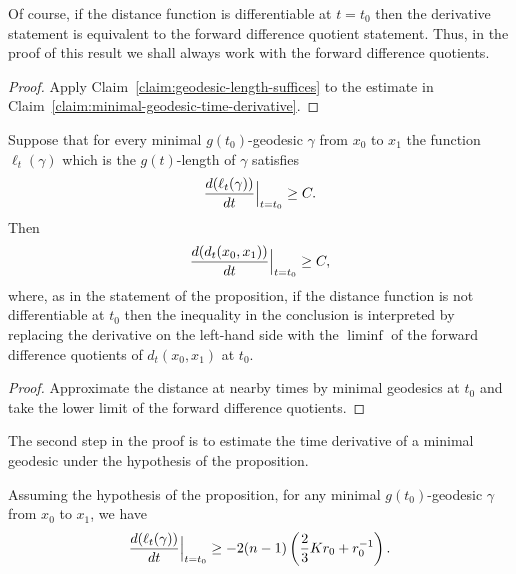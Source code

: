 \begin{remark}\label{rem:forward-difference-quotient}


Of course, if the distance function is differentiable at $t=t_0$
then the derivative statement is equivalent to the forward
difference quotient statement. Thus, in the proof of this result we
shall always work with the forward difference quotients.
\end{remark}

\begin{proof}
\sketch Apply Claim~\ref{claim:geodesic-length-suffices} to the estimate in
Claim~\ref{claim:minimal-geodesic-time-derivative}.

\end{proof}

\begin{claim}\label{claim:geodesic-length-suffices}
\label{geosuff}

Suppose that for every minimal $g(t_0)$-geodesic $\gamma$ from $x_0$
to $x_1$ the function $\ell_t(\gamma)$ which is the $g(t)$-length of
$\gamma$ satisfies
$$\frac{d(\ell_t(\gamma))}{dt}\Bigl|_{t=t_0}\Bigr.\ge C.$$
Then
$$\frac{d(d_t(x_0,x_1))}{dt}\Bigl|_{t=t_0}\Bigr.\ge C,$$
where, as in the statement of the proposition, if the distance
function is not differentiable at $t_0$ then the inequality in the
conclusion is interpreted by replacing the derivative on the
left-hand side with the $\liminf$ of the forward difference
quotients of $d_t(x_0,x_1)$ at  $t_0$.
\end{claim}

\begin{proof}
\sketch Approximate the distance at nearby times by minimal geodesics at
$t_0$ and take the lower limit of the forward difference quotients.
\end{proof}



The second step in the proof is to estimate the time derivative of a
minimal geodesic under the hypothesis of the proposition.

\begin{claim}\label{claim:minimal-geodesic-time-derivative}
\label{3.23}

Assuming the hypothesis of the proposition, for any
 minimal $g(t_0)$-geodesic $\gamma$ from $x_0$ to $x_1$, we have
$$\frac{d(\ell_t(\gamma))}{dt}\Bigl|_{t=t_0}\Bigr.\ge -2(n-1)
\left(\frac{2}{3}Kr_0+r_0^{-1}\right).$$
\end{claim}

